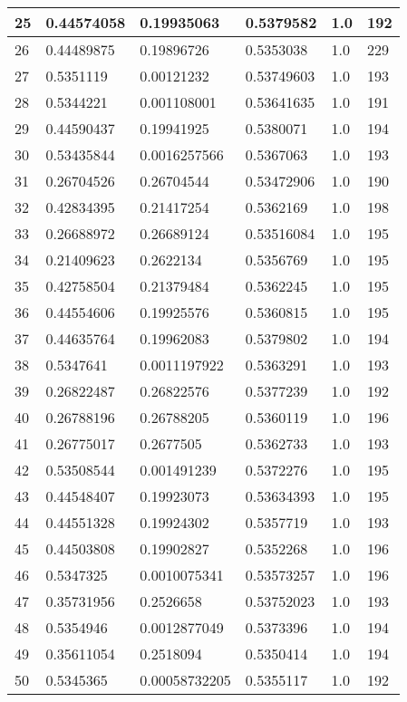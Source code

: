 \begin{longtable}{|l|l|l|l|l|l|}
25 & 0.44574058 & 0.19935063 & 0.5379582 & 1.0 & 192 \\ \hline 
26 & 0.44489875 & 0.19896726 & 0.5353038 & 1.0 & 229 \\ \hline 
27 & 0.5351119 & 0.00121232 & 0.53749603 & 1.0 & 193 \\ \hline 
28 & 0.5344221 & 0.001108001 & 0.53641635 & 1.0 & 191 \\ \hline 
29 & 0.44590437 & 0.19941925 & 0.5380071 & 1.0 & 194 \\ \hline 
30 & 0.53435844 & 0.0016257566 & 0.5367063 & 1.0 & 193 \\ \hline 
31 & 0.26704526 & 0.26704544 & 0.53472906 & 1.0 & 190 \\ \hline 
32 & 0.42834395 & 0.21417254 & 0.5362169 & 1.0 & 198 \\ \hline 
33 & 0.26688972 & 0.26689124 & 0.53516084 & 1.0 & 195 \\ \hline 
34 & 0.21409623 & 0.2622134 & 0.5356769 & 1.0 & 195 \\ \hline 
35 & 0.42758504 & 0.21379484 & 0.5362245 & 1.0 & 195 \\ \hline 
36 & 0.44554606 & 0.19925576 & 0.5360815 & 1.0 & 195 \\ \hline 
37 & 0.44635764 & 0.19962083 & 0.5379802 & 1.0 & 194 \\ \hline 
38 & 0.5347641 & 0.0011197922 & 0.5363291 & 1.0 & 193 \\ \hline 
39 & 0.26822487 & 0.26822576 & 0.5377239 & 1.0 & 192 \\ \hline 
40 & 0.26788196 & 0.26788205 & 0.5360119 & 1.0 & 196 \\ \hline 
41 & 0.26775017 & 0.2677505 & 0.5362733 & 1.0 & 193 \\ \hline 
42 & 0.53508544 & 0.001491239 & 0.5372276 & 1.0 & 195 \\ \hline 
43 & 0.44548407 & 0.19923073 & 0.53634393 & 1.0 & 195 \\ \hline 
44 & 0.44551328 & 0.19924302 & 0.5357719 & 1.0 & 193 \\ \hline 
45 & 0.44503808 & 0.19902827 & 0.5352268 & 1.0 & 196 \\ \hline 
46 & 0.5347325 & 0.0010075341 & 0.53573257 & 1.0 & 196 \\ \hline 
47 & 0.35731956 & 0.2526658 & 0.53752023 & 1.0 & 193 \\ \hline 
48 & 0.5354946 & 0.0012877049 & 0.5373396 & 1.0 & 194 \\ \hline 
49 & 0.35611054 & 0.2518094 & 0.5350414 & 1.0 & 194 \\ \hline 
50 & 0.5345365 & 0.00058732205 & 0.5355117 & 1.0 & 192 \\ \hline 
\end{longtable}